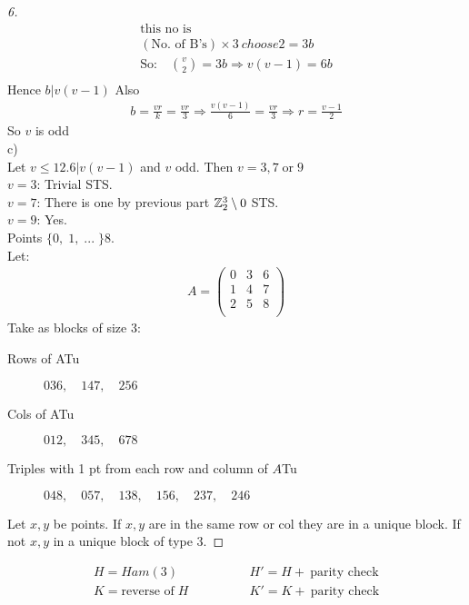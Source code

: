 \documentclass[]{amsart}
\theoremstyle{definition}
\theoremstyle{remark}
\numberwithin{equation}{section}
\begin{document}
\begin{proof}[6]
	\begin{align}[rabbit]
	\text{this no is}\\
	(\text{No. of B's}) \times {3 \ choose 2} = 3b \\
	\text{So:}\quad {v \choose 2} = 3b \Rightarrow v(v-1) = 6b\\
	\end{align}
	Hence $b | v(v-1)$ Also 
	\begin{align*}
		b= \frac{vr}{k} = \frac{vr}{3} \Rightarrow \frac{v(v-1)}{6} = \frac{vr}{3}\Rightarrow r = \frac{v-1}{2}
	\end{align*}
	So $v$ is odd\\
	c)\hfill \\
	Let $v\leq 12. 6| v(v-1)$ and $v$ odd.
	Then $v = 3, 7 \;\text{or}\; 9$\\
	$v = 3$: Trivial STS.\\
	$v = 7$: There is one by previous part $\mathbb{Z}_2^3\setminus 0$ STS.\\
	$v = 9$: Yes. \hfill \\
	Points $\{0,\;1,\;...\;\}8$. \\
	Let: 
	\begin{align*}
	A = \begin{pmatrix}
			0 & 3 & 6 \\
			1 & 4 & 7 \\
			2 & 5 & 8 \\
		\end{pmatrix}
	\end{align*}
	Take as blocks of size 3:
	\begin{description}
		\item[Rows of ATu]
		$036, \quad 147,\quad 256$
		\item[Cols of ATu]
		$012, \quad 345, \quad 678$
		\item[Triples with 1 pt from each row and column of $A$Tu]
		$048, \quad 057, \quad 138, \quad 156, \quad 237, \quad 246$\\
	\end{description}
	Let $x,y$ be points. If $x,y$ are in the same row or col they are in a unique block. If not $x,y$ in a unique block of type 3.
\end{proof}


\begin{align*}
	H = Ham(3) \qquad & \qquad H' = H + \ \text{parity check}\\
	K = \text{reverse of}\; H \qquad & \qquad K' = K + \ \text{parity check}
\end{align*}
\end{document}
